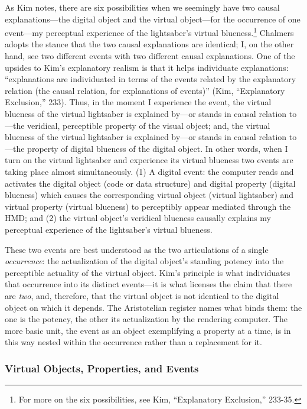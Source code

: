 \documentclass{article}
\begin{document}
As Kim notes, there are six possibilities when we seemingly have two causal explanations—the digital object and the virtual object—for the occurrence of one event—my perceptual experience of the lightsaber’s virtual blueness.\footnote{For more on the six possibilities, see Kim, “Explanatory Exclusion,” 233-35.} Chalmers adopts the stance that the two causal explanations are identical; I, on the other hand, see two different events with two different causal explanations. One of the upsides to Kim’s explanatory realism is that it helps individuate explanations: “explanations are individuated in terms of the events related by the explanatory relation (the causal relation, for explanations of events)” (Kim, “Explanatory Exclusion,” 233). Thus, in the moment I experience the event, the virtual blueness of the virtual lightsaber is explained by—or stands in causal relation to—the veridical, perceptible property of the visual object; and, the virtual blueness of the virtual lightsaber is explained by—or stands in causal relation to—the property of digital blueness of the digital object. In other words, when I turn on the virtual lightsaber and experience its virtual blueness two events are taking place almost simultaneously. (1) A digital event: the computer reads and activates the digital object (code or data structure) and digital property (digital blueness) which causes the corresponding virtual object (virtual lightsaber) and virtual property (virtual blueness) to perceptibly appear mediated through the HMD; and (2) the virtual object’s veridical blueness causally explains my perceptual experience of the lightsaber’s virtual blueness.

These two events are best understood as the two articulations of a single \textit{occurrence}: the actualization of the digital object's standing potency into the perceptible actuality of the virtual object. Kim's principle is what individuates that occurrence into its distinct events—it is what licenses the claim that there are \textit{two}, and, therefore, that the virtual object is not identical to the digital object on which it depends. The Aristotelian register names what binds them: the one is the potency, the other its actualization by the rendering computer. The more basic unit, the event as an object exemplifying a property at a time, is in this way nested within the occurrence rather than a replacement for it.

\subsubsection*{Virtual Objects, Properties, and Events}
\end{document}
